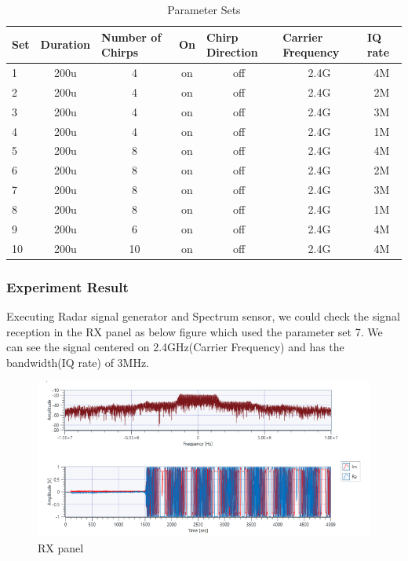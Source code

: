     \begin{table}[!h]\centering
        \hspace{10mm}
        \begin{tabular}{|l|c|c|c|c|c|c|}
        \hline
        \multicolumn{1}{|l|}{Set} & 
        \multicolumn{1}{l|}{Duration} & 
        \multicolumn{1}{l|}{Number of Chirps} & 
        \multicolumn{1}{l|}{On} & 
        \multicolumn{1}{l|}{Chirp Direction} & 
        \multicolumn{1}{l|}{Carrier Frequency} & 
        \multicolumn{1}{l|}{IQ rate} \\
        \hline
        1 & 200u & 4 & on & off & 2.4G & 4M \\ 
        \hline
        2 & 200u & 4 & on & off & 2.4G & 2M \\ 
        \hline
        3 & 200u & 4 & on & off & 2.4G & 3M \\ 
        \hline
        4 & 200u & 4 & on & off & 2.4G & 1M \\ 
        \hline
        5 & 200u & 8 & on & off & 2.4G & 4M \\ 
        \hline
        6 & 200u & 8 & on & off & 2.4G & 2M \\ 
        \hline
        7 & 200u & 8 & on & off & 2.4G & 3M \\ 
        \hline
        8 & 200u & 8 & on & off & 2.4G & 1M \\ 
        \hline
        9 & 200u & 6 & on & off & 2.4G & 4M \\ 
        \hline
        10 & 200u & 10 & on & off & 2.4G & 4M \\ 
        \hline
        \end{tabular}
        \caption{Parameter Sets}
    \end{table}
\clearpage 
    
    \subsubsection*{Experiment Result}
    Executing Radar signal generator and Spectrum sensor, we could check the signal reception in the RX panel as below figure which used the parameter set 7. We can see the signal centered on 2.4GHz(Carrier Frequency) and has the bandwidth(IQ rate) of 3MHz. \\
    \vspace{-4mm}  
    \begin{figure}[!h]\raggedleft
    \hspace{15mm}
		\includegraphics[width=.95\textwidth]{image/week04/1-1-0.png}
		\caption{\footnotesize RX panel}
		\vspace{-10pt}
    \end{figure}

